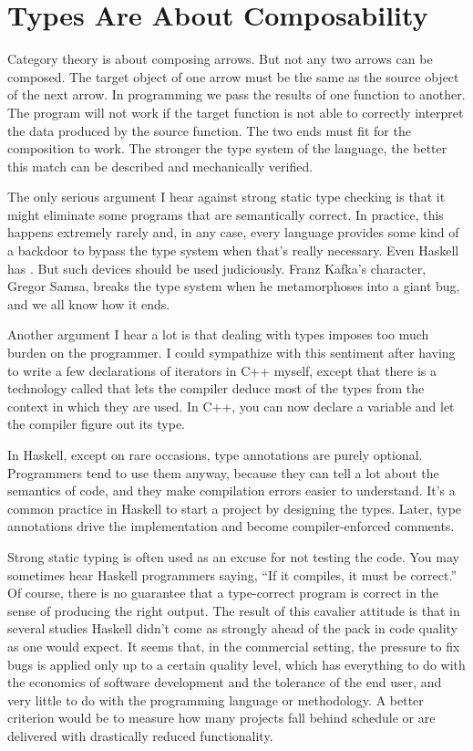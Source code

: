 \section{Types Are About Composability}

Category theory is about composing arrows. But not any two arrows can be
composed. The target object of one arrow must be the same as the source
object of the next arrow. In programming we pass the results of
one function to another. The program will not work if the target
function is not able to correctly interpret the data produced by the
source function. The two ends must fit for the composition to work. The
stronger the type system of the language, the better this match can be
described and mechanically verified.

The only serious argument I hear against strong static type checking is
that it might eliminate some programs that are semantically correct. In
practice, this happens extremely rarely and, in any case, every language
provides some kind of a backdoor to bypass the type system when that's
really necessary. Even Haskell has . But such
devices should be used judiciously. Franz Kafka's character, Gregor
Samsa, breaks the type system when he metamorphoses into a giant bug,
and we all know how it ends.

Another argument I hear a lot is that dealing with types imposes too
much burden on the programmer. I could sympathize with this sentiment
after having to write a few declarations of iterators in C++ myself,
except that there is a technology called  that lets
the compiler deduce most of the types from the context in which they are
used. In C++, you can now declare a variable  and let the
compiler figure out its type.

In Haskell, except on rare occasions, type annotations are purely
optional. Programmers tend to use them anyway, because they can tell a
lot about the semantics of code, and they make compilation errors easier
to understand. It's a common practice in Haskell to start a project by
designing the types. Later, type annotations drive the implementation
and become compiler-enforced comments.

Strong static typing is often used as an excuse for not testing the
code. You may sometimes hear Haskell programmers saying, ``If it
compiles, it must be correct.'' Of course, there is no guarantee that a
type-correct program is correct in the sense of producing the right
output. The result of this cavalier attitude is that in several studies
Haskell didn't come as strongly ahead of the pack in code quality as one
would expect. It seems that, in the commercial setting, the pressure to
fix bugs is applied only up to a certain quality level, which has
everything to do with the economics of software development and the
tolerance of the end user, and very little to do with the programming
language or methodology. A better criterion would be to measure how many
projects fall behind schedule or are delivered with drastically reduced
functionality.

